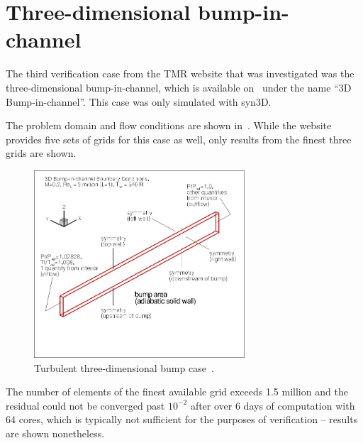 \section{Three-dimensional bump-in-channel}
\label{sec:syn3dbump}
The third verification case from the TMR website that was investigated was the three-dimensional bump-in-channel, which is available on~\cite{tmr} under the name ``3D Bump-in-channel''. This case was only simulated with syn3D. 

The problem domain and flow conditions are shown in~. While the website provides five sets of grids for this case as well, only results from the finest three grids are shown.
\begin{figure}
    \centering
    \includegraphics[width=0.7\textwidth]{figs/3dbump/bump3dBCpic1.jpg}
    \caption{Turbulent three-dimensional bump case~\cite{tmr}.}
    \label{fig:3dbump}
\end{figure}

The number of elements of the finest available grid exceeds 1.5 million and the residual could not be converged past $10^{-2}$ after over 6 days of computation with 64 cores, which is typically not sufficient for the purposes of verification -- results are shown nonetheless.

